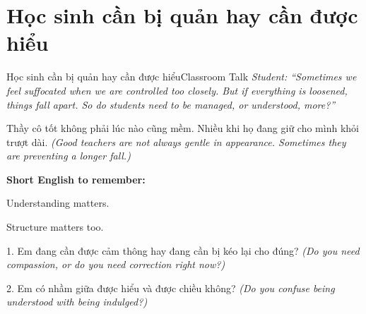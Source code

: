 \section{Học sinh cần bị quản hay cần được hiểu}
\begin{truyen}{Học sinh cần bị quản hay cần được hiểu}{Classroom Talk}
\textit{Student: ``Sometimes we feel suffocated when we are controlled too closely. But if everything is loosened, things fall apart. So do students need to be managed, or understood, more?''}\\[4pt]



\end{truyen}

\begin{baihoc}
Thầy cô tốt không phải lúc nào cũng mềm. Nhiều khi họ đang giữ cho mình khỏi trượt dài.
\textit{(Good teachers are not always gentle in appearance. Sometimes they are preventing a longer fall.)}
\end{baihoc}

\begin{ghinhoanh}
\textbf{Short English to remember:}

Understanding matters.

Structure matters too.
\end{ghinhoanh}

\begin{tuhocnhanh}
1. Em đang cần được cảm thông hay đang cần bị kéo lại cho đúng? \textit{(Do you need compassion, or do you need correction right now?)}

2. Em có nhầm giữa được hiểu và được chiều không? \textit{(Do you confuse being understood with being indulged?)}
\end{tuhocnhanh}
\ngancach

